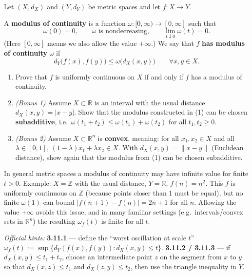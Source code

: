 \begin{exercise}
\label{ex:3.11}
Let $(X,d_X)$ and $(Y,d_Y)$ be metric spaces and let $f : X \to Y$.

A \textbf{modulus of continuity} is a function $\omega : [0,\infty) \to [0,\infty]$ such that
$$\omega(0) = 0, \qquad \omega \text{ is nondecreasing}, \qquad \lim_{t \downarrow 0}\omega(t) = 0.$$
(Here $[0,\infty]$ means we also allow the value $+\infty$.) We say that $f$ \textbf{has modulus
of continuity} $\omega$ if
$$d_Y\big(f(x), f(y)\big) \leq \omega\big(d_X(x,y)\big) \qquad \forall x,y \in X.$$
\begin{enumerate}[label=\textbf{\arabic*.}]
  \item Prove that $f$ is uniformly continuous on $X$ if and only if $f$ has a modulus of
    continuity.
  \item \textit{(Bonus 1)} Assume $X \subset \mathbb{R}$ is an interval with the usual distance
    $d_X(x,y) = |x-y|$. Show that the modulus constructed in (1) can be chosen
    \textbf{subadditive}, i.e.\ $\omega(t_1+t_2) \leq \omega(t_1) + \omega(t_2)$ for all
    $t_1, t_2 \geq 0$.
  \item \textit{(Bonus 2)} Assume $X \subset \mathbb{R}^n$ is \textbf{convex}, meaning: for all
    $x_1, x_2 \in X$ and all $\lambda \in [0,1]$, $(1-\lambda)x_1 + \lambda x_2 \in X$. With
    $d_X(x,y) = \|x-y\|$ (Euclidean distance), show again that the modulus from (1) can be chosen
    subadditive.
\end{enumerate}

\begin{remark}[official]
In general metric spaces a modulus of continuity may have infinite value for finite $t > 0$.
Example: $X = \mathbb{Z}$ with the usual distance, $Y = \mathbb{R}$, $f(n) = n^2$. This $f$ is
uniformly continuous on $\mathbb{Z}$ (because points closer than 1 must be equal), but no finite
$\omega(1)$ can bound $|f(n+1) - f(n)| = 2n+1$ for all $n$. Allowing the value $+\infty$ avoids
this issue, and in many familiar settings (e.g.\ intervals/convex sets in $\mathbb{R}^n$) the
resulting $\omega_f(t)$ is finite for all $t$.
\end{remark}

\textit{Official hints:} \textbf{3.11.1} --- define the ``worst oscillation at scale $t$''
$\omega_f(t) := \sup\{d_Y(f(x),f(y)) : d_X(x,y) \leq t\}$. \textbf{3.11.2 / 3.11.3} --- if
$d_X(x,y) \leq t_1 + t_2$, choose an intermediate point $z$ on the segment from $x$ to $y$ so
that $d_X(x,z) \leq t_1$ and $d_X(z,y) \leq t_2$, then use the triangle inequality in $Y$.
\end{exercise}
